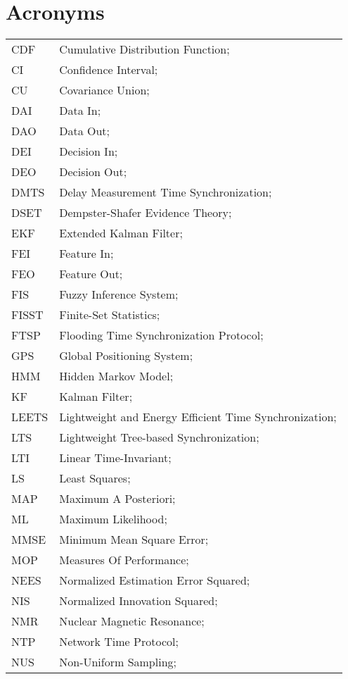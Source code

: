 \newpage
\section*{Acronyms}
\begin{longtable}{ll}
	CDF			& Cumulative Distribution Function; \\
	CI			& Confidence Interval; \\
	CU			& Covariance Union; \\
	DAI			& Data In; \\
	DAO			& Data Out; \\
	DEI			& Decision In; \\
	DEO 		& Decision Out; \\
	DMTS		& Delay Measurement Time Synchronization; \\
	DSET 		& Dempster-Shafer Evidence Theory; \\		
	EKF			& Extended Kalman Filter; \\
	FEI			& Feature In; \\
	FEO			& Feature Out; \\
	FIS			& Fuzzy Inference System; \\
	FISST		& Finite-Set Statistics; \\
	FTSP		& Flooding Time Synchronization Protocol; \\
	GPS			& Global Positioning System; \\
	HMM			& Hidden Markov Model; \\
	KF 			& Kalman Filter; \\
	LEETS		& Lightweight and Energy Efficient Time Synchronization; \\
	LTS			& Lightweight Tree-based Synchronization; \\
	LTI			& Linear Time-Invariant; \\
	LS			& Least Squares; \\
	MAP			& Maximum A Posteriori; \\
	ML			& Maximum Likelihood; \\
	MMSE		& Minimum Mean Square Error; \\
	MOP 		& Measures Of Performance; \\
	NEES		& Normalized Estimation Error Squared; \\
	NIS			& Normalized Innovation Squared; \\
	NMR 		& Nuclear Magnetic Resonance; \\
	NTP			& Network Time Protocol; \\
	NUS 		& Non-Uniform Sampling; \\ 

\end{longtable}
